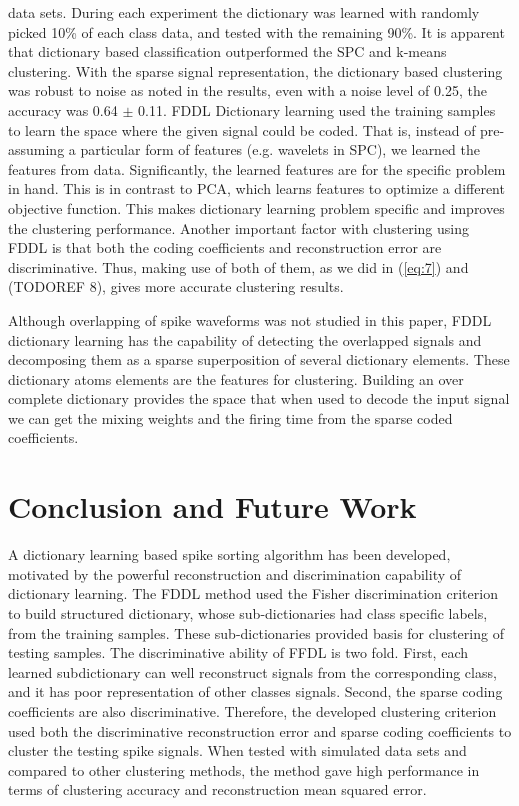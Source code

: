 \documentclass[conference]{IEEEtran}
\begin{document}
	data sets. During each experiment the dictionary was learned with randomly picked 10\% of each class data, and tested with the remaining 90\%. It is apparent that dictionary based classification outperformed the SPC and k-means clustering. With the sparse signal representation, the dictionary based clustering was robust to noise as noted in the results, even with a noise level of 0.25, the accuracy was 0.64 $\pm$ 0.11. FDDL Dictionary learning used the training samples to learn the space where the given signal could be coded. That is, instead of pre-assuming a particular form of features (e.g. wavelets in SPC), we learned the features from data. Significantly, the learned features are for the specific problem in hand. This is in contrast to PCA, which learns features to optimize a different objective function. This makes dictionary learning problem specific and improves the clustering performance. Another important factor with clustering using FDDL is that both the coding coefficients and reconstruction error are discriminative. Thus, making use of both of them, as we did in (\ref{eq:7}) and (TODOREF 8), gives more accurate clustering results.
	
	Although overlapping of spike waveforms was not studied in this paper, FDDL dictionary learning has the capability of detecting the overlapped signals and decomposing them as a sparse superposition of several dictionary elements. These dictionary atoms elements are the features for clustering. Building an over complete dictionary \cite{lewicki2000learning} provides the space that when used to decode the input signal we can get the mixing weights and the firing time from the sparse coded coefficients.
	
	\section{Conclusion and Future Work}
	A dictionary learning based spike sorting algorithm has been developed, motivated by the powerful reconstruction and discrimination capability of dictionary learning. The FDDL method used the Fisher discrimination criterion to build structured dictionary, whose sub-dictionaries had class specific labels, from the training samples. These sub-dictionaries provided basis for clustering of testing samples. The discriminative ability of FFDL is two fold. First, each learned subdictionary can well reconstruct signals from the corresponding class, and it has poor representation of other classes signals. Second, the sparse coding coefficients are also discriminative. Therefore, the developed clustering criterion used both the discriminative reconstruction error and sparse coding coefficients to cluster the testing spike signals. When tested with simulated data sets and compared to other clustering methods, the method gave high performance in terms of clustering accuracy and reconstruction mean squared error.
\end{document}
